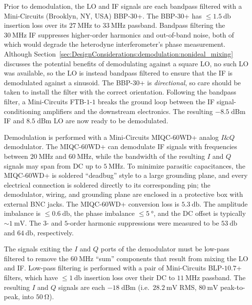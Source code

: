 Prior to demodulation, the LO and IF signals are each bandpass filtered
with a Mini-Circuits (Brooklyn, NY, USA) {BBP-$30$+}.
The {BBP-$30$+} has $\leq \SI{1.5}{\decibel}$ insertion loss over
its $\SI{27}{\mega\hertz}$ to $\SI{33}{\mega\hertz}$ passband.
Bandpass filtering the $\SI{30}{\mega\hertz}$ IF
suppresses higher-order harmonics and out-of-band noise,
both of which would degrade the heterodyne interferometer's phase measurement.
Although Section~\ref{sec:DesignConsiderations:demodulation:nonideal_mixing}
discusses the potential benefits of demodulating against a square LO,
no such LO was available, so
the LO is instead bandpass filtered
to ensure that the IF is demodulated against a sinusoid.
The {BBP-$30$+} is \emph{directional}, so
care should be taken to install the filter
with the correct orientation.
Following the bandpass filter,
a Mini-Circuits {FTB-$1$-$1$} breaks the ground loop between
the IF signal-conditioning amplifiers and
the downstream electronics.
The resulting $-8.5 \; \text{dBm}$ IF and $8.5 \; \text{dBm}$ LO
are now ready to be demodulated.

Demodulation is performed with a
Mini-Circuits {MIQC-$60$WD+}
analog $I\&Q$ demodulator.
The {MIQC-$60$WD+} can demodulate IF signals with frequencies between
$\SI{20}{\mega\hertz}$ and $\SI{60}{\mega\hertz}$, while
the bandwidth of the resulting $I$ and $Q$ signals
may span from DC up to $\SI{5}{\mega\hertz}$.
To minimize parasitic capacitances,
the {MIQC-$60$WD+} is soldered ``deadbug'' style
\cite{linear_technology_high_speed_amplifier_tech}
to a large grounding plane, and
every electrical connection is soldered
directly to its corresponding pin;
the demodulator, wiring, and grounding plane
are enclosed in a protective box with external BNC jacks.
The {MIQC-$60$WD+} conversion loss is $\SI{5.3}{\decibel}$.
The amplitude imbalance is $\leq \SI{0.6}{\decibel}$,
the phase imbalance $\leq \SI{5}{\degree}$, and
the DC offset is typically $\sim \SI{1}{\milli\volt}$.
The $3$- and $5$-order harmonic suppressions
were measured to be $\SI{53}{\decibel}$ and $\SI{64}{\decibel}$, respectively.

The signals exiting the $I$ and $Q$ ports of the demodulator
must be low-pass filtered
to remove the $\SI{60}{\mega\hertz}$ ``sum'' components
that result from mixing the LO and IF.
Low-pass filtering is performed
with a pair of Mini-Circuits {BLP-$10.7$+} filters, which
have $\leq \SI{1}{\decibel}$ insertion loss
over their DC to $\SI{11}{\mega\hertz}$ passband.
The resulting $I$ and $Q$ signals are each
$-18 \; \text{dBm}$
(i.e.\ $\SI{28.2}{\milli\volt}$ RMS,
$\SI{80}{\milli\volt}$ peak-to-peak,
into $\SI{50}{\ohm}$).


